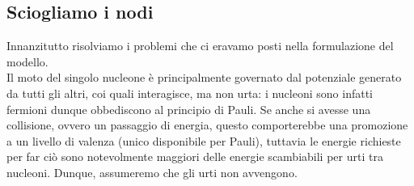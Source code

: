 \subsection{Sciogliamo i nodi} 
Innanzitutto risolviamo i problemi che ci eravamo posti nella formulazione del modello.\\
Il moto del singolo nucleone è principalmente governato dal potenziale generato da tutti gli altri, coi quali interagisce, ma non urta: i nucleoni sono infatti fermioni dunque obbediscono al principio di Pauli. Se anche si avesse una collisione, ovvero un passaggio di energia, questo comporterebbe una promozione a un livello di valenza (unico disponibile per Pauli), tuttavia le energie richieste per far ciò sono notevolmente maggiori delle energie scambiabili per urti tra nucleoni. Dunque, assumeremo che gli urti non avvengono.

